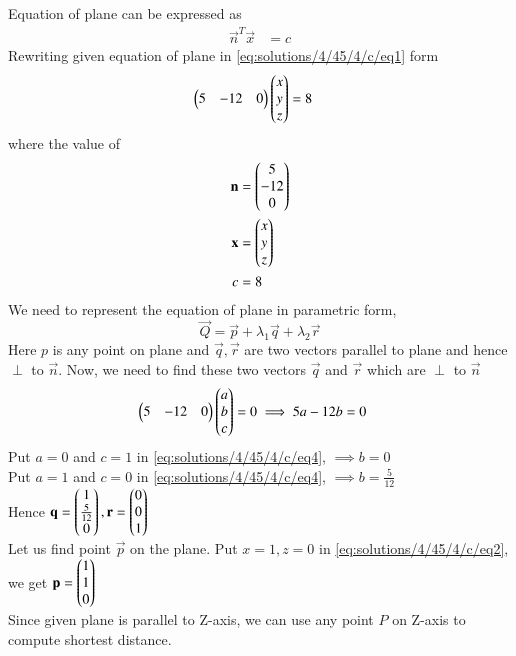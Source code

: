 Equation of plane can be expressed as 
\begin{align}\label{eq:solutions/4/45/4/c/eq1}
	\vec{n}^T\vec{x} &= c
\end{align}
Rewriting given equation of plane in \eqref{eq:solutions/4/45/4/c/eq1} form
\begin{align}\label{eq:solutions/4/45/4/c/eq2}
	\begin{pmatrix}5 & -12 & 0\end{pmatrix}\begin{pmatrix}x\\y\\z\end{pmatrix} &= 8
\end{align}
where the value of 
\begin{align}
    \mathbf{n} &= \begin{pmatrix}5\\-12\\0\end{pmatrix} \\
    \mathbf{x} &= \begin{pmatrix}x\\y\\z\end{pmatrix} \\
    c &= 8
\end{align}
We need to represent the equation of plane in parametric form,
\begin{equation}\label{eq:solutions/4/45/4/c/eq3}
	\vec{Q} = \vec{p} + \lambda_1\vec{q} + \lambda_2\vec{r}
\end{equation}
Here $p$ is any point on plane and $\vec{q}, \vec{r}$ are two vectors parallel to plane and hence $\perp$ to $\vec{n}$. Now, we need to find these two vectors $\vec{q}$ and $\vec{r}$ which are $\perp$ to $\vec{n}$
\begin{align}
	\begin{pmatrix}5 & -12 & 0\end{pmatrix}\begin{pmatrix}a\\b\\c\end{pmatrix} = 0
	\implies 5a - 12b &= 0 \label{eq:solutions/4/45/4/c/eq4}
\end{align}
Put $a=0$ and $c=1$ in \eqref{eq:solutions/4/45/4/c/eq4}, $\implies b=0$\\
Put $a=1$ and $c=0$ in \eqref{eq:solutions/4/45/4/c/eq4}, $\implies b=\frac{5}{12}$\\
Hence $\mathbf{q} = \begin{pmatrix}1\\\frac{5}{12}\\0\end{pmatrix}, \mathbf{r} = \begin{pmatrix}0\\0\\1\end{pmatrix}$\\
Let us find point $\vec{p}$ on the plane. Put $x=1,z=0$ in \eqref{eq:solutions/4/45/4/c/eq2}, we get $\mathbf{p} = \begin{pmatrix}1\\1\\0\end{pmatrix}$\\
Since given plane is parallel to Z-axis, we can use any point $P$ on Z-axis to compute shortest distance. 
